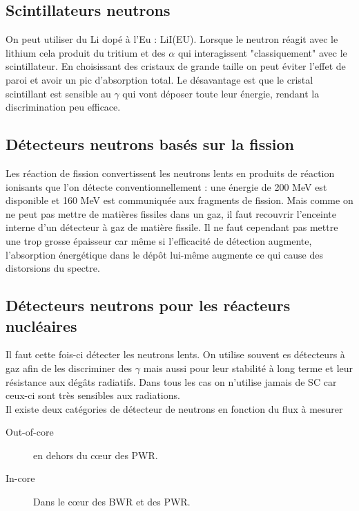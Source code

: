 \subsection{Scintillateurs neutrons}%
On peut utiliser du Li dopé à l'Eu : LiI(EU). Lorsque le neutron réagit avec le lithium cela produit
du tritium et des $\alpha$ qui interagissent "classiquement" avec le scintillateur. En choisissant
des cristaux de grande taille on peut éviter l'effet de paroi et avoir un pic d'absorption total.
Le désavantage est que le cristal scintillant est sensible au $\gamma$ qui vont déposer toute leur
énergie, rendant la discrimination peu efficace.


\subsection{Détecteurs neutrons basés sur la fission}%
Les réaction de fission convertissent les neutrons lents en produits de réaction ionisants que l'on
détecte conventionnellement : une énergie de 200 MeV est disponible et 160 MeV est communiquée aux
fragments de fission. Mais comme on ne peut pas mettre de matières fissiles dans un gaz, il faut 
recouvrir l'enceinte interne d'un détecteur à gaz de matière fissile. Il ne faut cependant pas 
mettre une trop grosse épaisseur car même si l'efficacité de détection augmente, l'absorption 
énergétique dans le dépôt lui-même augmente ce qui cause des distorsions du spectre.


\subsection{Détecteurs neutrons pour les réacteurs nucléaires}%
Il faut cette fois-ci détecter les neutrons lents. On utilise souvent es détecteurs à gaz afin
de les discriminer des $\gamma$ mais aussi pour leur stabilité à long terme et leur résistance aux
dégâts radiatifs. Dans tous les cas on n'utilise jamais de SC car ceux-ci sont très sensibles aux
radiations.\\

Il existe deux catégories de détecteur de neutrons en fonction du flux à mesurer

\begin{description}
\item[Out-of-core] en dehors du cœur des PWR. 
\item[In-core] Dans le cœur des BWR et des PWR. 
\end{description}\ 

